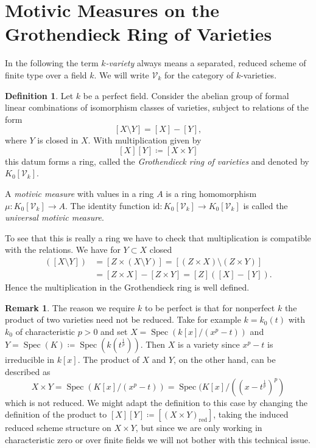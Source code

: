 \documentclass[11pt, a4paper, german, twoside]{article}
\theoremstyle{plain}
\theoremstyle{definition}
\newtheorem{definition}[theorem]{Definition}
\newtheorem{remark}[theorem]{Remark}
\newcommand{\gring}[1][k]{K_0[\mathcal{V}_#1]}
\DeclareMathOperator{\Spec}{Spec}
\begin{document}
\section{Motivic Measures on the Grothendieck Ring of Varieties}
\label{sec1}
In the following the term \emph{$k$-variety} always means a separated, reduced scheme of finite type over a field $k$.
We will write $\mathcal{V}_k$ for the category of $k$-varieties. 

\begin{definition}
    \label{gringdef}
    Let $k$ be a perfect field. 
    Consider the abelian group of formal linear combinations of isomorphism classes of varieties, subject to relations of the form
    \[
        [X \setminus Y] = [X] - [Y],
    \] where $Y$ is closed in $X$.
    With multiplication given by
    \[
        [X][Y] \coloneqq [X \times Y]
    \]
    this datum forms a ring, called the \emph{Grothendieck ring of varieties} and denoted by $\gring$. 
    
    A \emph{motivic measure} with values in a ring $A$ is a ring homomorphism $\mu \colon \gring \to A$. The identity function
    $\mathrm{id} \colon \gring \to \gring$ is called the \emph{universal motivic measure}.
\end{definition}

To see that this is really a ring we have to check that multiplication is compatible with the relations. We have for $Y \subset X$ closed
\begin{align*}
    [Z] ([X \setminus Y])   &= [Z \times (X \setminus Y)] = [(Z \times X) \setminus (Z \times Y)] \\
                            &= [Z \times X] - [Z \times Y] = [Z]([X] - [Y]).
\end{align*}
Hence the multiplication in the Grothendieck ring is well defined.

\begin{remark}
The reason we require $k$ to be perfect is that for nonperfect $k$ the product of two varieties need not be reduced. Take for example
$k = k_0(t)$ with $k_0$ of characteristic $p > 0$ and set $X = \Spec(k[x]/(x^p - t))$ and $Y = \Spec(K) \coloneqq \Spec(k(t^{\frac{1}{p}}))$. 
Then $X$ is a variety since $x^p - t$ is irreducible in $k[x]$. The product of $X$ and $Y$, on the other hand, can be described as
    \[
        X \times Y = \Spec(K[x]/(x^p - t)) = \Spec(K[x]/((x-t^{\frac{1}{p}})^p)
    \]
which is not reduced. We might adapt the definition to this case by changing the definition of the product to 
$[X][Y] \coloneqq [(X \times Y)_{\text{red}}]$, taking the induced reduced scheme structure on $X \times Y$, but since we are only working
in characteristic zero or over finite fields we will not bother with this technical issue.
\end{remark}
\end{document}

